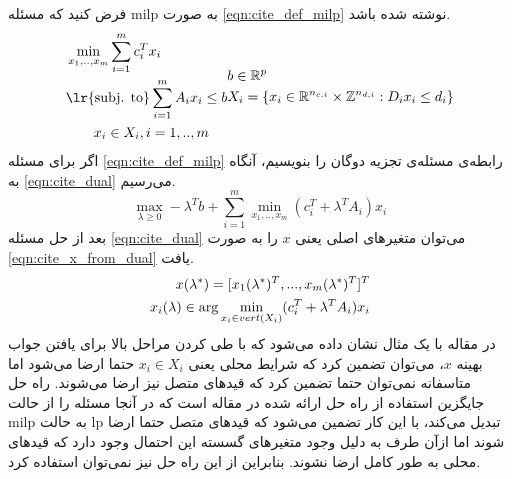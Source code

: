 	فرض کنید که مسئله milp به صورت \cref{eqn:cite_def_milp} نوشته شده باشد. 
	\begin{subequations}
		\begin{align}\label{eqn:cite_def_milp}
			&\min_{x_1,..,x_m} \sum_{i=1}^m c_i^Tx_i \notag \\
			&\text{\lr{subj. to}} \sum_{i=1}^m A_ix_i \le b \notag \\
			&\quad\quad x_i \in X_i, i = 1,..,m
		\end{align}
		\begin{align}
			&b \in \mathbb{R}^p \notag \\
			&X_i = \{x_i\in \mathbb{R}^{n_{c,i}}\times \mathbb{Z}^{n_{d,i}}:D_ix_i \le d_i\}
		\end{align}
	\end{subequations}
	اگر برای مسئله \cref{eqn:cite_def_milp} رابطه‌ی مسئله‌ی تجزیه دوگان را بنویسیم، آنگاه به \cref{eqn:cite_dual}  می‌رسیم. 
	\begin{equation}\label{eqn:cite_dual}
		\max_{\lambda \ge 0} - \lambda^Tb + \sum_{i=1}^m \min_{x_1,..,x_m}(c_i^T + \lambda^TA_i)x_i
	\end{equation}
	بعد از حل مسئله \cref{eqn:cite_dual} می‌توان متغیرهای اصلی یعنی $x$ را به صورت \cref{eqn:cite_x_from_dual} یافت. 
	\begin{align}\label{eqn:cite_x_from_dual}
		x(\lambda^*) = [x_1(\lambda^*)^T, ..., x_m(\lambda^*)^T]^T \notag \\
		x_i(\lambda) \in \arg \min_{x_i \in vert(X_i)} (c_i^T + \lambda^TA_i)x_i
	\end{align}
	در مقاله \cite{decentralized_approach} با یک مثال نشان داده می‌شود که با طی کردن مراحل بالا برای یافتن جواب بهینه $x$، می‌توان تضمین کرد که شرایط محلی یعنی $x_i \in X_i$ حتما ارضا می‌شود اما متاسفانه نمی‌توان حتما تضمین کرد که قیدهای متصل نیز ارضا می‌شوند. راه حل جایگزین استفاده از راه حل ارائه شده در مقاله \cite{shor2012minimization} است که در آنجا مسئله را از حالت milp به حالت lp تبدیل می‌کند، با این کار تضمین می‌شود که قیدهای متصل حتما ارضا شوند اما ازآن طرف به دلیل وجود متغیرهای گسسته این احتمال وجود دارد که قیدهای محلی به طور کامل ارضا نشوند. بنابراین از این راه حل نیز نمی‌توان استفاده کرد. 
	

